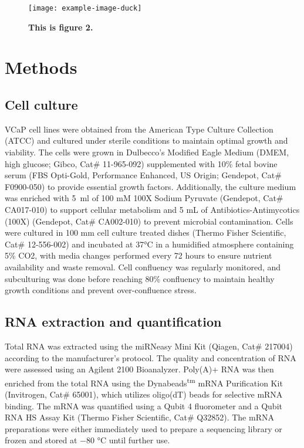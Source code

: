 \documentclass[pdflatex, sn-mathphys-num, lineno]{sn-jnl}%
\theoremstyle{thmstyleone}%
\theoremstyle{thmstyletwo}%
\theoremstyle{thmstylethree}%
\begin{document}
\begin{figure}[!h]
	\texttt{[image: example-image-duck]}
	\caption{\bf This is figure 2.}
	\label{fig:f2}
\end{figure}

\section{Methods}\label{sec:methods}

\subsection{Cell culture}

VCaP cell lines were obtained from the American Type Culture Collection (ATCC) and cultured under sterile conditions to maintain optimal growth and viability.
The cells were grown in Dulbecco's Modified Eagle Medium (DMEM, high glucose; Gibco, Cat\# 11-965-092) supplemented with 10\% fetal bovine serum (FBS Opti-Gold, Performance Enhanced, US Origin; Gendepot, Cat\# F0900-050) to provide essential growth factors.
Additionally, the culture medium was enriched with \SI{5}{\ml} of 100 mM 100X Sodium Pyruvate (Gendepot, Cat\# CA017-010) to support cellular metabolism and 5 mL of Antibiotics-Antimycotics (100X) (Gendepot, Cat\# CA002-010) to prevent microbial contamination.
Cells were cultured in 100 mm cell culture treated dishes (Thermo Fisher Scientific, Cat\# 12-556-002) and incubated at 37°C in a humidified atmosphere containing 5\% CO2, with media changes performed every 72 hours to ensure nutrient availability and waste removal.
Cell confluency was regularly monitored, and subculturing was done before reaching 80\% confluency to maintain healthy growth conditions and prevent over-confluence stress.

\subsection{RNA extraction and quantification}

Total RNA was extracted using the miRNeasy Mini Kit (Qiagen, Cat\# 217004) according to the manufacturer's protocol.
The quality and concentration of RNA were assessed using an Agilent 2100 Bioanalyzer.
Poly(A)+ RNA was then enriched from the total RNA using the Dynabeads\textsuperscript{tm} mRNA Purification Kit (Invitrogen, Cat\# 65001), which utilizes oligo(dT) beads for selective mRNA binding.
The mRNA was quantified using a Qubit 4 fluorometer and a Qubit RNA HS Assay Kit (Thermo Fisher Scientific, Cat\# Q32852).
The mRNA preparations were either immediately used to prepare a sequencing library or frozen and stored at \num{-80} °C until further use.
\end{document}

